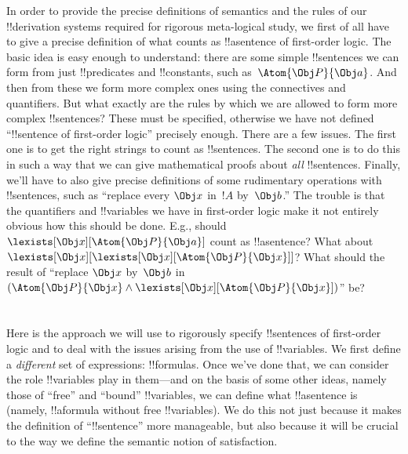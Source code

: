 In order to provide the precise definitions of semantics and the rules
of our !!{derivation} systems required for rigorous meta-logical study, we
first of all have to give a precise definition of what counts as
!!a{sentence} of first-order logic. The basic idea is easy enough to
understand: there are some simple !!{sentence}s we can form from just
!!{predicate}s and !!{constant}s, such as~$\Atom{\Obj P}{\Obj a}$. And
then from these we form more complex ones using the connectives and
quantifiers. But what exactly are the rules by which we are allowed to
form more complex !!{sentence}s?  These must be specified, otherwise
we have not defined ``!!{sentence} of first-order logic'' precisely
enough. There are a few issues. The first one is to get the right
strings to count as !!{sentence}s. The second one is to do this in
such a way that we can give mathematical proofs about \emph{all}
!!{sentence}s. Finally, we'll have to also give precise definitions of
some rudimentary operations with !!{sentence}s, such as ``replace
every $\Obj x$ in~$!A$ by~$\Obj b$.'' The trouble is that the
quantifiers and !!{variable}s we have in first-order logic make it not
entirely obvious how this should be done. E.g., should $\lexists[\Obj
x][\Atom{\Obj P}{\Obj a}]$ count as !!a{sentence}? What about
$\lexists[\Obj x][\lexists[\Obj x][\Atom{\Obj P}{\Obj x}]]$? What
should the result of ``replace $\Obj x$ by~$\Obj b$ in $(\Atom{\Obj
P}{\Obj x} \land \lexists[\Obj x][\Atom{\Obj P}{\Obj x}])$'' be?






\section{}

Here is the approach we will use to rigorously specify !!{sentence}s
of first-order logic and to deal with the issues arising from the use
of !!{variable}s. We first define a \emph{different} set of
expressions: !!{formula}s. Once we've done that, we can consider the
role !!{variable}s play in them---and on the basis of some other
ideas, namely those of ``free'' and ``bound'' !!{variable}s, we can
define what !!a{sentence} is (namely, !!a{formula} without free
!!{variable}s). We do this not just because it makes the definition of
``!!{sentence}'' more manageable, but also because it will be crucial
to the way we define the semantic notion of satisfaction.

